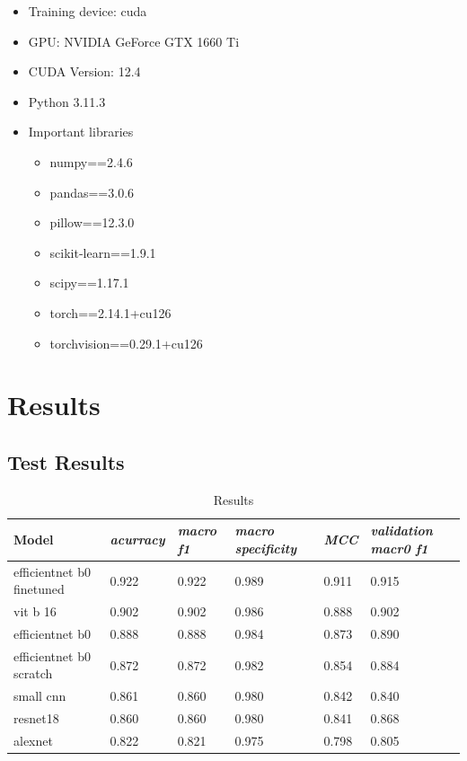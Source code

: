 \documentclass[conference]{IEEEtran}
\begin{document}
\begin{itemize}
    \item Training device: cuda
    \item GPU: NVIDIA GeForce GTX 1660 Ti
    \item CUDA Version: 12.4
    \item Python 3.11.3
    \item Important libraries
    \begin{itemize}
        \item numpy==2.4.6
        \item pandas==3.0.6
        \item pillow==12.3.0
        \item scikit-learn==1.9.1
        \item scipy==1.17.1
        \item torch==2.14.1+cu126
        \item torchvision==0.29.1+cu126
    \end{itemize}

\end{itemize}

\section{Results}

\subsection{Test Results}

\begin{table}[htbp]
\caption{Results}
\begin{center}
\begin{tabular}{|m{5em}|m{4em}|m{4em}|m{4em}|m{4em}|m{4em}|}
\hline
\textbf{Model}&\textit{acurracy}&\textit{macro f1}&\textit{macro specificity}&\textit{MCC}&\textit{validation macr0 f1}\\
\hline
efficientnet b0 finetuned & 0.922 & 0.922 & 0.989 & 0.911 & 0.915 \\
vit b 16 & 0.902 & 0.902 & 0.986 & 0.888 & 0.902 \\
efficientnet b0 & 0.888 & 0.888 & 0.984 & 0.873 & 0.890 \\
efficientnet b0 scratch & 0.872 & 0.872 & 0.982 & 0.854 & 0.884 \\
small cnn & 0.861 & 0.860 & 0.980 & 0.842 & 0.840 \\
resnet18 & 0.860 & 0.860 & 0.980 & 0.841 & 0.868 \\
alexnet & 0.822 & 0.821 & 0.975 & 0.798 & 0.805 \\
\hline
\end{tabular}
\label{tables:tab4}
\end{center}
\end{table}
\end{document}

